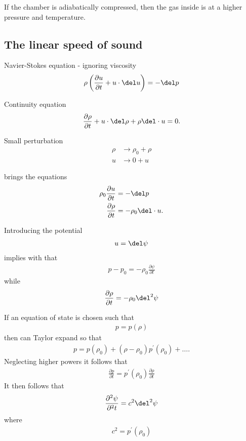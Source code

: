 If the chamber is adiabatically compressed, then the gas inside is at a higher pressure and temperature.

\subsection{The linear speed of sound}
Navier-Stokes equation - ignoring viscosity
\begin{align}
\rho \left( \frac{\partial u}{\partial t} + u \cdot \del u \right) = - \del p
\end{align}

Continuity equation
\begin{align}
 \frac{\partial \rho }{\partial t} + u \cdot \del \rho + \rho \del \cdot u = 0.
\end{align}

Small perturbation
\begin{align}
  \rho &\rightarrow \rho_0  + \rho \\
  u &\rightarrow 0  + u 
\end{align}

brings the equations
\begin{align}
 \rho_0  \frac{\partial u}{\partial t} &= - \del p \label{eqn:euclidianNSLinear} \\
 \frac{\partial \rho }{\partial t} &=  - \rho_0  \del \cdot u. \label{eqn:euclidianContinuityLinear}
\end{align}

Introducing the potential
\begin{align}
 u = \del \psi
\end{align}
implies with  that
\begin{align}
p-p_0 = -\rho_0 \frac{\partial \psi}{\partial t}
\end{align}
while 
\begin{align}
\frac{\partial \rho}{\partial t} = - \rho_0 \del^2 \psi
\end{align}

If an equation of state is chosen such that 
\begin{align}
p=p(\rho)
\end{align}
then can Taylor expand so that
\begin{align}
p = p(\rho_0) + (\rho-\rho_0) p^\prime(\rho_0) + \ldots.
\end{align}
Neglecting higher powers it follows that
\begin{align}
 \frac{\partial p}{\partial t} = p^\prime(\rho_0) \frac{\partial \rho}{\partial t}
\end{align}
It then follows that 
\begin{align}
\frac{\partial^2 \psi}{\partial^2 t} = c^2 \del^2 \psi
\end{align}
where
\begin{align}
c^2 =  p^\prime(\rho_0)
\end{align}
